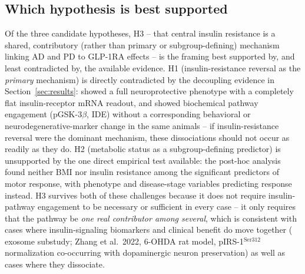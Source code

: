 \documentclass[11pt, a4paper]{article}
\begin{document}
\subsection{Which hypothesis is best supported}
Of the three candidate hypotheses, H3 -- that central insulin resistance is
a shared, contributory (rather than primary or subgroup-defining) mechanism
linking AD and PD to GLP-1RA effects -- is the framing best supported by,
and least contradicted by, the available evidence. H1 (insulin-resistance
reversal as the \emph{primary} mechanism) is directly contradicted by the
decoupling evidence in Section~\ref{sec:results}: \citet{carranza2021}
showed a full neuroprotective phenotype with a completely flat
insulin-receptor mRNA readout, and \citet{paladugu2021} showed biochemical
pathway engagement (pGSK-3$\beta$, IDE) without a corresponding behavioral or
neurodegenerative-marker change in the same animals -- if insulin-resistance
reversal were the dominant mechanism, these dissociations should not occur
as readily as they do. H2 (metabolic status as a subgroup-defining
predictor) is unsupported by the one direct empirical test available: the
\citet{athauda2019} post-hoc analysis found neither BMI nor insulin
resistance among the significant predictors of motor response, with
phenotype and disease-stage variables predicting response instead. H3
survives both of these challenges because it does not require insulin-pathway
engagement to be necessary or sufficient in every case -- it only requires
that the pathway be \emph{one real contributor among several}, which is
consistent with cases where insulin-signaling biomarkers and clinical
benefit do move together (\citet{athauda2019} exosome substudy; Zhang et
al.\ 2022, 6-OHDA rat model, pIRS-1$^{\text{Ser312}}$ normalization
co-occurring with dopaminergic neuron preservation) as well as cases where
they dissociate.
\end{document}
